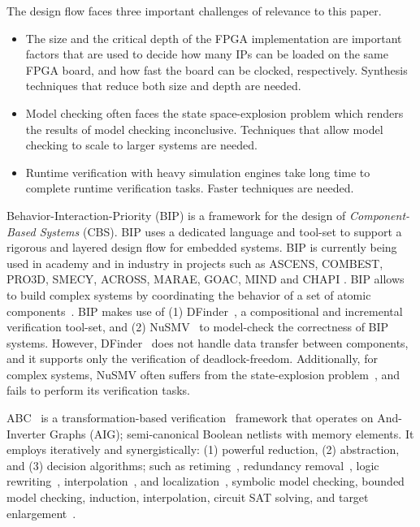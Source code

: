 The design flow faces three important challenges of relevance to this paper. 
\begin{itemize}
  \item The size and the critical depth of the FPGA implementation are important factors that are used to decide how many IPs can 
    be loaded on the same FPGA board, and how fast the board can be clocked, respectively. 
    Synthesis techniques that reduce both size and depth are needed. 
  \item Model checking often faces the state space-explosion problem which renders the results of model checking inconclusive. 
    Techniques that allow model checking to scale to larger systems are needed. 
  \item Runtime verification with heavy simulation engines take long time to complete runtime verification tasks. 
    Faster techniques are needed. 
\end{itemize}
%
Behavior-Interaction-Priority (BIP) is a framework for the design of 
{\em Component-Based Systems} (CBS). 
BIP uses a dedicated language and tool-set to support a rigorous 
and layered design flow for embedded systems. 
BIP is currently being used in academy and in industry in projects such as 
ASCENS, COMBEST, PRO3D, SMECY, ACROSS, MARAE, GOAC, MIND and CHAPI \cite{bipwebsite}. 
BIP allows to build complex systems by coordinating the behavior of a set of 
atomic components~\cite{bip11}.
BIP makes use of (1) DFinder~\cite{dfinder}, a compositional  
and incremental verification tool-set, and (2) NuSMV~\cite{nusmv}
to model-check the correctness of BIP systems. 
However, DFinder~\cite{BBL14} does not handle data transfer between components, 
and it supports only the verification of deadlock-freedom. 
Additionally, for complex systems, NuSMV often suffers from the state-explosion problem~\cite{sipser2006introduction}, and fails to perform its verification tasks.

ABC~\cite{brayton2010abc} is a transformation-based 
verification~\cite{KuBa01} framework that operates on 
And-Inverter Graphs (AIG); semi-canonical Boolean netlists with
memory elements. It employs iteratively and synergistically: (1) powerful reduction, (2) abstraction, and (3) decision algorithms; such as
retiming~\cite{KuBa01}, 
redundancy removal~\cite{HmBPK05,KuMP01,BjesseC00,aziz-fmsd-00}, 
logic rewriting~\cite{BjBo04}, interpolation~\cite{McMillan03}, 
and localization~\cite{Wang03}, 
symbolic model checking, bounded model checking, induction, 
interpolation, circuit SAT solving, 
and target enlargement~\cite{MoGS00,MoMZ01,HoSH00,BaKuAb02,Hari05expert}.

